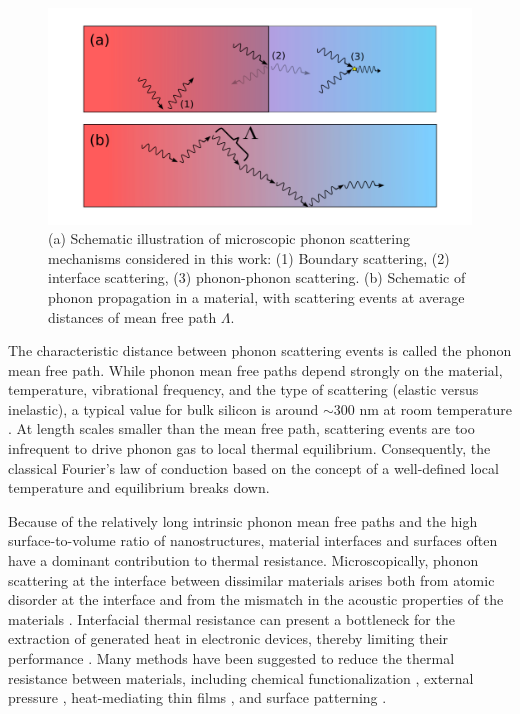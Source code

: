 \begin{figure}
\begin{center}
 \includegraphics[width=.99\columnwidth]{inkscape/scattering.pdf}
 \caption{(a) Schematic illustration of microscopic phonon scattering mechanisms considered in this work: (1) Boundary scattering, (2) interface scattering, (3) phonon-phonon scattering. (b) Schematic of phonon propagation in a material, with scattering events at average distances of mean free path $\Lambda$.}
\label{fig:intro_scattering}
\end{center}
\end{figure}

The characteristic distance between phonon scattering events is called the phonon mean free path. While phonon mean free paths depend strongly on the material, temperature, vibrational frequency, and the type of scattering (elastic versus inelastic), a typical value for bulk silicon is around $\sim 300$ nm at room temperature \cite{ju99}. At length scales smaller than the mean free path, scattering events are too infrequent to drive phonon gas to local thermal equilibrium. Consequently, the classical Fourier's law of conduction \cite{fourier} based on the concept of a well-defined local temperature and equilibrium breaks down. 

Because of the relatively long intrinsic phonon mean free paths and the high surface-to-volume ratio of nanostructures, material interfaces and surfaces often have a dominant contribution to thermal resistance. Microscopically, phonon scattering at the interface between dissimilar materials arises both from atomic disorder at the interface and from the mismatch in the acoustic properties of the materials \cite{khalatnikov52}. Interfacial thermal resistance can present a bottleneck for the extraction of generated heat in electronic devices, thereby limiting their performance \cite{pop10,moore14}. Many methods have been suggested to reduce the thermal resistance between materials, including chemical functionalization \cite{hopkins11,kaur14,han15b}, external pressure \cite{shen11,chalopin12}, heat-mediating thin films \cite{english12}, and surface patterning \cite{merabia14}. 

